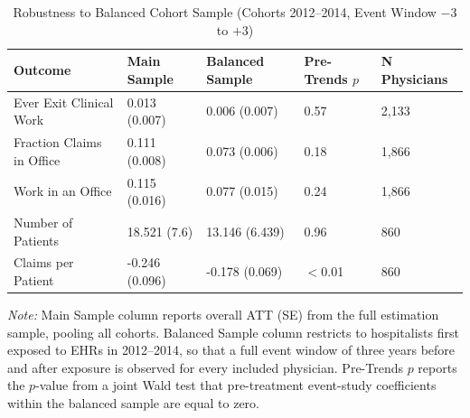 \begin{table}[!h]
\centering
\caption{\label{tab:balanced_robustness}Robustness to Balanced Cohort Sample (Cohorts 2012--2014, Event Window $-3$ to $+3$)}
\begin{threeparttable}
\begin{tabular}[t]{lllll}
\toprule
Outcome & Main Sample & Balanced Sample & Pre-Trends $p$ & N Physicians\\
\midrule
Ever Exit Clinical Work & 0.013 (0.007) & 0.006 (0.007) & 0.57 & 2,133\\
Fraction Claims in Office & 0.111 (0.008) & 0.073 (0.006) & 0.18 & 1,866\\
Work in an Office & 0.115 (0.016) & 0.077 (0.015) & 0.24 & 1,866\\
Number of Patients & 18.521 (7.6) & 13.146 (6.439) & 0.96 & 860\\
Claims per Patient & -0.246 (0.096) & -0.178 (0.069) & $<$0.01 & 860\\
\bottomrule
\end{tabular}
\begin{tablenotes}
\item \textit{Note: } Main Sample column reports overall ATT (SE) from the full estimation sample, pooling all cohorts. Balanced Sample column restricts to hospitalists first exposed to EHRs in 2012--2014, so that a full event window of three years before and after exposure is observed for every included physician. Pre-Trends $p$ reports the $p$-value from a joint Wald test that pre-treatment event-study coefficients within the balanced sample are equal to zero.
\end{tablenotes}
\end{threeparttable}
\end{table}